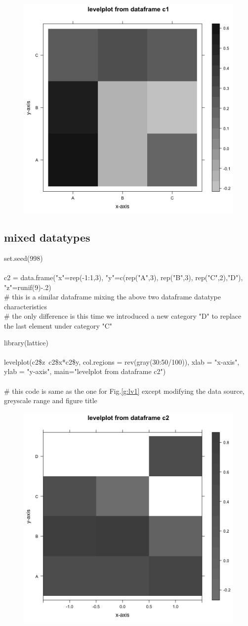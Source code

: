 \documentclass[../note.tex]{subfiles} %
\begin{document}
\begin{figure}[H]
    \centering
    \includegraphics[width=.5\linewidth]{graph/lvPlt2.png}
    \label{g:lv2}
\end{figure}

\subsection{mixed datatypes}
\begin{code}
set.seed(998)\\\\
c2 = data.frame("x"=rep(-1:1,3), "y"=c(rep("A",3), rep("B",3), rep("C",2),"D"), "z"=runif(9)-.2)\\
\# this is a similar dataframe mixing the above two dataframe datatype characteristics\\
\# the only difference is this time we introduced a new category "D" to replace the last element under category "C"
\end{code}

\begin{code}
library(lattice)\\\\
levelplot(c2\$z~c2\$x*c2\$y, col.regions = rev(gray(30:50/100)), xlab = "x-axis", ylab = "y-axis", main="levelplot from dataframe c2")\\\\
\# this code is same as the one for Fig.\ref{g:lv1} except modifying the data source, greyscale range and figure title
\end{code}

\begin{figure}[H]
    \centering
    \includegraphics[width=.5\linewidth]{graph/lvPlt3.png}
    \label{g:lv3}
\end{figure}
\end{document}
